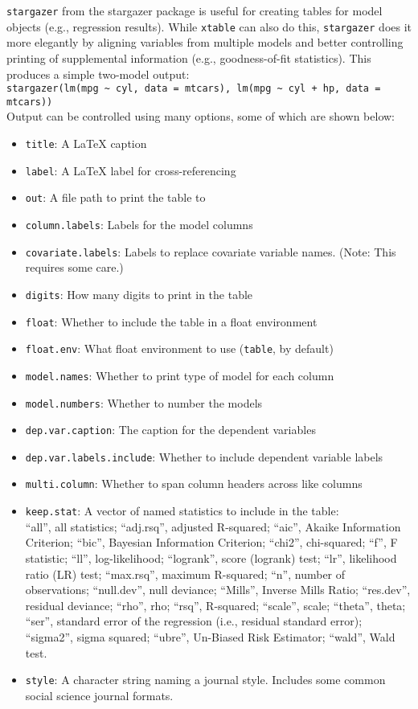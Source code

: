 \documentclass[11pt, a4paper]{article}
\begin{document}
\texttt{stargazer} from the stargazer package is useful for creating tables for model objects (e.g., regression results). While \texttt{xtable} can also do this, \texttt{stargazer} does it more elegantly by aligning variables from multiple models and better controlling printing of supplemental information (e.g., goodness-of-fit statistics). This produces a simple two-model output:\\ \verb|stargazer(lm(mpg ~ cyl, data = mtcars), lm(mpg ~ cyl + hp, data = mtcars))|\\Output can be controlled using many options, some of which are shown below:

\begin{itemize}
\item \texttt{title}: A \LaTeX{} caption
\item \texttt{label}: A \LaTeX{} label for cross-referencing
\item \texttt{out}: A file path to print the table to
\item \texttt{column.labels}: Labels for the model columns
\item \texttt{covariate.labels}: Labels to replace covariate variable names. (Note: This requires some care.)
\item \texttt{digits}: How many digits to print in the table
\item \texttt{float}: Whether to include the table in a float environment
\item \texttt{float.env}: What float environment to use (\texttt{table}, by default)
\item \texttt{model.names}: Whether to print type of model for each column
\item \texttt{model.numbers}: Whether to number the models
\item \texttt{dep.var.caption}: The caption for the dependent variables
\item \texttt{dep.var.labels.include}: Whether to include dependent variable labels
\item \texttt{multi.column}: Whether to span column headers across like columns
\item \texttt{keep.stat}: A vector of named statistics to include in the table:\\``all'', all statistics; ``adj.rsq'', adjusted R-squared; ``aic'', Akaike Information Criterion; ``bic'', Bayesian Information Criterion; ``chi2'', chi-squared; ``f'', F statistic; ``ll'', log-likelihood; ``logrank'', score (logrank) test; ``lr'', likelihood ratio (LR) test; ``max.rsq'', maximum R-squared; ``n'', number of observations; ``null.dev'', null deviance; ``Mills'', Inverse Mills Ratio; ``res.dev'', residual deviance; ``rho'', rho; ``rsq'', R-squared; ``scale'', scale; ``theta'', theta; ``ser'', standard error of the regression (i.e., residual standard error); ``sigma2'', sigma squared; ``ubre'', Un-Biased Risk Estimator; ``wald'', Wald test.
\vspace{1em}
\item \texttt{style}: A character string naming a journal style. Includes some common social science journal formats.
\end{itemize}
\end{document}
